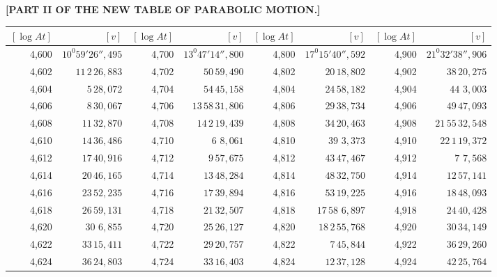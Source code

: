 \clearpage
{}
\begingroup
\centering
\fontsize{9}{9}\selectfont
\setlength{\tabcolsep}{1.25pt}
\renewcommand{\arraystretch}{.9}
\setlength{\parskip}{0pt}
\textbf{[PART II OF THE NEW TABLE OF PARABOLIC MOTION.]}
\par\vspace{7pt}
\begin{tabular}{|r|r||r|r||r|r||r|r|}
\hline
\([\log At]\) & \([v]\) & \([\log At]\) & \([v]\) & \([\log At]\) & \([v]\) & \([\log At]\) & \([v]\) \\
\hline
4,600 & \(10^{0}59'26'',\!495\) & 4,700 & \(13^{0}47'14'',\!800\) & 4,800 & \(17^{0}15'40'',\!592\) & 4,900 & \(21^{0}32'38'',\!906\) \\[1pt]
4,602 & \(11\,2\,26,\!883\) & 4,702 & \(50\,59,\!490\) & 4,802 & \(20\,18,\!802\) & 4,902 & \(38\,20,\!275\) \\
4,604 & \(5\,28,\!072\) & 4,704 & \(54\,45,\!158\) & 4,804 & \(24\,58,\!182\) & 4,904 & \(44\,\,3,\!003\) \\
4,606 & \(8\,30,\!067\) & 4,706 & \(13\,58\,31,\!806\) & 4,806 & \(29\,38,\!734\) & 4,906 & \(49\,47,\!093\) \\
4,608 & \(11\,32,\!870\) & 4,708 & \(14\,2\,19,\!439\) & 4,808 & \(34\,20,\!463\) & 4,908 & \(21\,55\,32,\!548\) \\[1pt]
4,610 & \(14\,36,\!486\) & 4,710 & \(6\,\,8,\!061\) & 4,810 & \(39\,\,3,\!373\) & 4,910 & \(22\,1\,19,\!372\) \\[1pt]
4,612 & \(17\,40,\!916\) & 4,712 & \(9\,57,\!675\) & 4,812 & \(43\,47,\!467\) & 4,912 & \(7\,\,7,\!568\) \\
4,614 & \(20\,46,\!165\) & 4,714 & \(13\,48,\!284\) & 4,814 & \(48\,32,\!750\) & 4,914 & \(12\,57,\!141\) \\
4,616 & \(23\,52,\!235\) & 4,716 & \(17\,39,\!894\) & 4,816 & \(53\,19,\!225\) & 4,916 & \(18\,48,\!093\) \\
4,618 & \(26\,59,\!131\) & 4,718 & \(21\,32,\!507\) & 4,818 & \(17\,58\,\,6,\!897\) & 4,918 & \(24\,40,\!428\) \\[1pt]
4,620 & \(30\,\,6,\!855\) & 4,720 & \(25\,26,\!127\) & 4,820 & \(18\,2\,55,\!768\) & 4,920 & \(30\,34,\!149\) \\[1pt]
4,622 & \(33\,15,\!411\) & 4,722 & \(29\,20,\!757\) & 4,822 & \(7\,45,\!844\) & 4,922 & \(36\,29,\!260\) \\
4,624 & \(36\,24,\!803\) & 4,724 & \(33\,16,\!403\) & 4,824 & \(12\,37,\!128\) & 4,924 & \(42\,25,\!764\) \\

\end{tabular}
